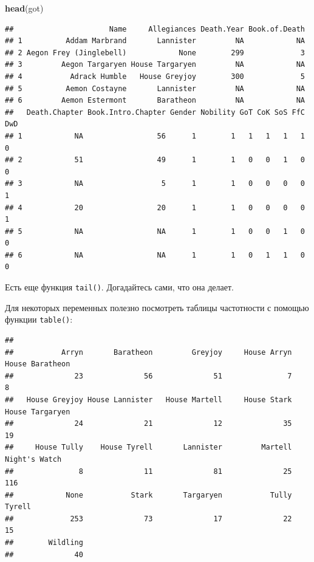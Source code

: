 \documentclass[]{book}
\newenvironment{Shaded}{\begin{snugshade}}{\end{snugshade}}
\newcommand{\KeywordTok}[1]{\textcolor[rgb]{0.13,0.29,0.53}{\textbf{#1}}}
\newcommand{\OperatorTok}[1]{\textcolor[rgb]{0.81,0.36,0.00}{\textbf{#1}}}
\newcommand{\NormalTok}[1]{#1}
\begin{document}
\begin{Shaded}
\begin{Highlighting}[]
\KeywordTok{head}\NormalTok{(got)}
\end{Highlighting}
\end{Shaded}

\begin{verbatim}
##                      Name     Allegiances Death.Year Book.of.Death
## 1          Addam Marbrand       Lannister         NA            NA
## 2 Aegon Frey (Jinglebell)            None        299             3
## 3         Aegon Targaryen House Targaryen         NA            NA
## 4           Adrack Humble   House Greyjoy        300             5
## 5          Aemon Costayne       Lannister         NA            NA
## 6         Aemon Estermont       Baratheon         NA            NA
##   Death.Chapter Book.Intro.Chapter Gender Nobility GoT CoK SoS FfC DwD
## 1            NA                 56      1        1   1   1   1   1   0
## 2            51                 49      1        1   0   0   1   0   0
## 3            NA                  5      1        1   0   0   0   0   1
## 4            20                 20      1        1   0   0   0   0   1
## 5            NA                 NA      1        1   0   0   1   0   0
## 6            NA                 NA      1        1   0   1   1   0   0
\end{verbatim}

Есть еще функция \texttt{tail()}. Догадайтесь сами, что она делает.

Для некоторых переменных полезно посмотреть таблицы частотности с
помощью функции \texttt{table()}:

\begin{Shaded}
\end{Shaded}

\begin{verbatim}
## 
##           Arryn       Baratheon         Greyjoy     House Arryn House Baratheon 
##              23              56              51               7               8 
##   House Greyjoy House Lannister   House Martell     House Stark House Targaryen 
##              24              21              12              35              19 
##     House Tully    House Tyrell       Lannister         Martell   Night's Watch 
##               8              11              81              25             116 
##            None           Stark       Targaryen           Tully          Tyrell 
##             253              73              17              22              15 
##        Wildling 
##              40
\end{verbatim}
\end{document}
